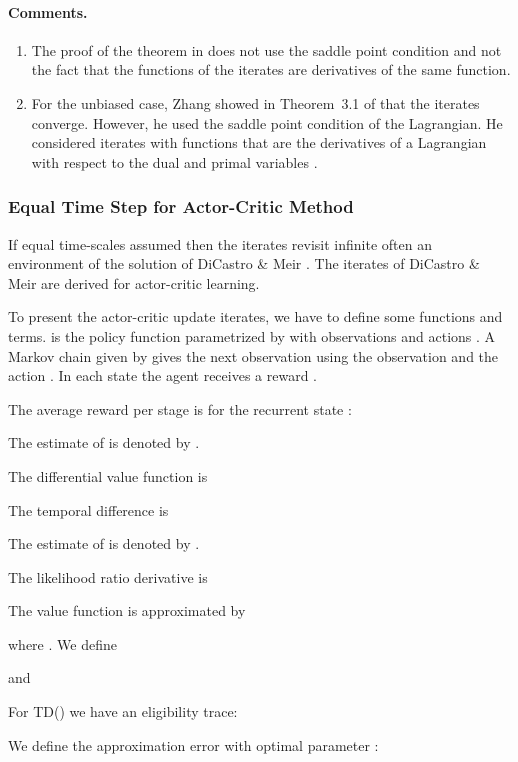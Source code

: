 \documentclass{article}
\begin{document}
\paragraph{Comments.}
\begin{enumerate}[label=\textbf{(C\arabic*)}]
\item
The proof of the theorem in \cite{Zhang:07} does not use the
saddle point condition and not the fact that the functions of the
iterates are derivatives of the same function.

\item
For the unbiased case, Zhang showed in Theorem~3.1 of \cite{Zhang:07}
that the iterates converge.
However, he used the saddle point condition of the Lagrangian.
He considered
iterates with functions that are the derivatives of a Lagrangian
with respect to the dual
and primal variables \cite{Zhang:07}.

\end{enumerate}


\subsubsection{Equal Time Step for Actor-Critic Method}
If equal time-scales assumed then the iterates revisit infinite often
an environment of the solution of DiCastro \& Meir \cite{DiCastro:10}.
The iterates of DiCastro \& Meir are derived for actor-critic
learning.


To present the actor-critic update iterates,
we have to define some functions and terms.
 is the policy function parametrized by
 with observations  and actions .
A Markov chain given by  gives the next
observation  using the observation  and the action .
In each state  the agent receives a reward .


The average reward per stage is for the recurrent state :

The estimate of  is denoted by .

The differential value function is


The temporal difference is

The estimate of  is denoted by .


The likelihood ratio derivative  is


The value function  is approximated by

where .
We define 

and


For TD() we have an eligibility trace:


We define the approximation error with optimal parameter :
\end{document}
